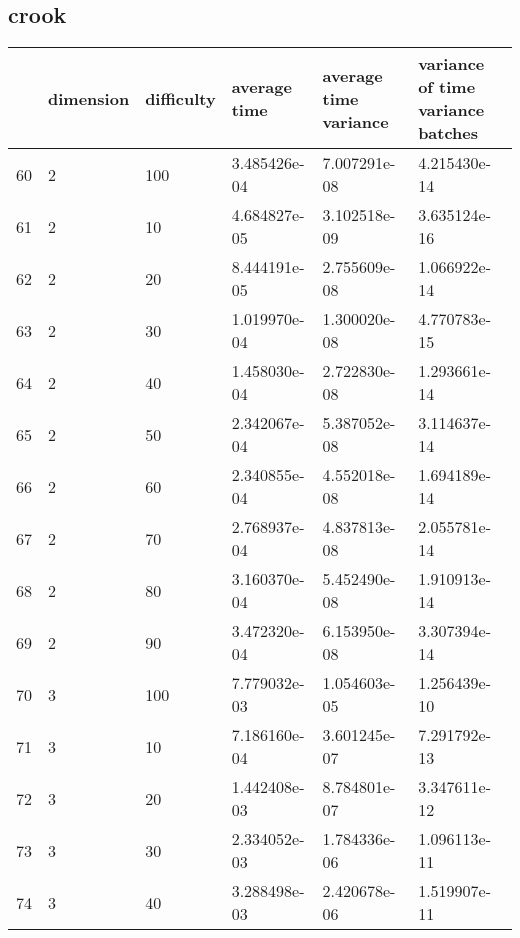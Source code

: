 \documentclass{article}
\begin{document}
\subsection{crook}
\begin{center}
\begin{tabular}{llllll}
\toprule
{} & dimension & difficulty &  average time & average time variance & variance of time variance batches \\
\midrule
60 &         2 &        100 &  3.485426e-04 &          7.007291e-08 &                      4.215430e-14 \\
61 &         2 &         10 &  4.684827e-05 &          3.102518e-09 &                      3.635124e-16 \\
62 &         2 &         20 &  8.444191e-05 &          2.755609e-08 &                      1.066922e-14 \\
63 &         2 &         30 &  1.019970e-04 &          1.300020e-08 &                      4.770783e-15 \\
64 &         2 &         40 &  1.458030e-04 &          2.722830e-08 &                      1.293661e-14 \\
65 &         2 &         50 &  2.342067e-04 &          5.387052e-08 &                      3.114637e-14 \\
66 &         2 &         60 &  2.340855e-04 &          4.552018e-08 &                      1.694189e-14 \\
67 &         2 &         70 &  2.768937e-04 &          4.837813e-08 &                      2.055781e-14 \\
68 &         2 &         80 &  3.160370e-04 &          5.452490e-08 &                      1.910913e-14 \\
69 &         2 &         90 &  3.472320e-04 &          6.153950e-08 &                      3.307394e-14 \\
70 &         3 &        100 &  7.779032e-03 &          1.054603e-05 &                      1.256439e-10 \\
71 &         3 &         10 &  7.186160e-04 &          3.601245e-07 &                      7.291792e-13 \\
72 &         3 &         20 &  1.442408e-03 &          8.784801e-07 &                      3.347611e-12 \\
73 &         3 &         30 &  2.334052e-03 &          1.784336e-06 &                      1.096113e-11 \\
74 &         3 &         40 &  3.288498e-03 &          2.420678e-06 &                      1.519907e-11 \\

\end{tabular}
\end{center}
\end{document}
